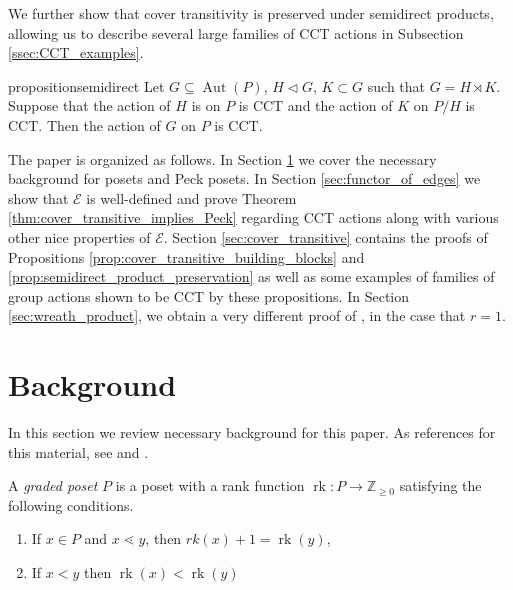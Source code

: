 \documentclass[smallextended, envcountsame, numbook]{svjour3}
\numberwithin{equation}{section}
\newcommand\rk{\operatorname{rk}}
\newcommand\Aut{\operatorname{Aut}}
\begin{document}
We further show that cover transitivity is preserved under semidirect products, allowing us to describe several large families of CCT actions in Subsection \ref{ssec:CCT_examples}.

\begin{restatable}{proposition}{semidirect}
\label{prop:semidirect_product_preservation}
Let $G\subseteq \Aut(P)$, $H\triangleleft G$, $K\subset G$ such that $G = H\rtimes K$.  Suppose that the action of $H$ is on $P$ is CCT and the action of $K$ on $P/H$ is CCT. Then the action of $G$ on $P$ is CCT.
\end{restatable}

The paper is organized as follows. In Section \ref{sec:background} we cover the necessary background for posets and Peck posets.  In Section \ref{sec:functor_of_edges} we show that $\mathcal E$ is well-defined and prove Theorem \ref{thm:cover_transitive_implies_Peck} regarding CCT actions along with various other nice properties of $\mathcal E$. Section \ref{sec:cover_transitive} contains the proofs of Propositions \ref{prop:cover_transitive_building_blocks} and \ref{prop:semidirect_product_preservation} as well as some examples of families of group actions shown to be CCT by these propositions. In Section \ref{sec:wreath_product}, we obtain a very different proof of \cite[Theorem 1.1]{pak}, in the case that $r = 1$.








\section{Background}\label{sec:background}

In this section we review necessary background for this paper.
As references for this material, see
\cite[Chapter 4]{stanley_alg_comb} and \cite{quotients_stanley}.


A {\it graded poset} $P$ is a poset with a rank function $\rk\colon P \rightarrow \mathbb Z_{\geq 0}$ satisfying the following conditions.
\begin{enumerate}
  \item If $x\in P$ and $x\lessdot y$, then $rk(x) + 1 = \rk(y)$,
  \item If $x < y$ then $\rk(x) < \rk(y)$ 
\end{enumerate}
\end{document}
